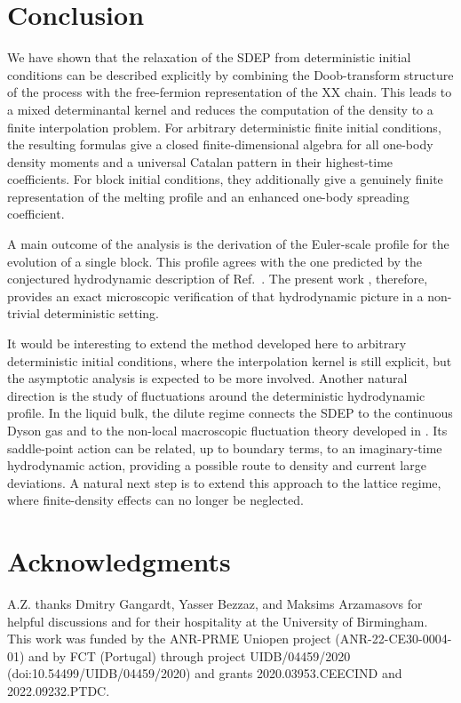 \documentclass[11pt]{article}
\numberwithin{equation}{section}
\newcommand{\1}{\mathbf 1}
\begin{document}
\section{Conclusion}
\label{sec:conclusion}

We have shown that the relaxation of the SDEP from deterministic initial
conditions can be described explicitly by combining the Doob-transform structure
of the process with the free-fermion representation of the XX chain.  This leads
to a mixed determinantal kernel and reduces the computation of the density to a
finite interpolation problem.  For arbitrary deterministic finite initial conditions, the resulting formulas
give a closed finite-dimensional algebra for all one-body density moments and a
universal Catalan pattern in their highest-time coefficients.  For block initial
conditions, they additionally give a genuinely finite representation of the
melting profile and an enhanced one-body spreading coefficient.

A main outcome of the analysis is the derivation of the Euler-scale profile for
the evolution of a single block.  This profile agrees with the one predicted by
the conjectured hydrodynamic description of Ref.~\cite{ZahraDubailSchutz2025}.  The present work
, therefore, provides an exact microscopic verification of that hydrodynamic
picture in a non-trivial deterministic setting.


It would be interesting to
extend the method developed here to arbitrary deterministic initial conditions,
where the interpolation kernel is still explicit, but the asymptotic analysis is
expected to be more involved. 
Another natural direction is the study of fluctuations around the deterministic hydrodynamic profile. In the liquid bulk, the dilute regime connects the SDEP to the continuous Dyson gas and to the non-local macroscopic fluctuation theory developed in \cite{DandekarKrapivskyMallick2024}. Its saddle-point action can be related, up to boundary terms, to an imaginary-time hydrodynamic action, providing a possible route to density and current large deviations. A natural next step is to extend this approach to the lattice regime, where finite-density effects can no longer be neglected.


\section*{Acknowledgments}
A.Z. thanks Dmitry Gangardt, Yasser Bezzaz, and Maksims Arzamasovs for
helpful discussions and for their hospitality at the University of
Birmingham. This work was funded by the ANR-PRME Uniopen project
(ANR-22-CE30-0004-01) and by FCT (Portugal) through project
UIDB/04459/2020 (doi:10.54499/UIDB/04459/2020) and grants
2020.03953.CEECIND and 2022.09232.PTDC.
\end{document}
